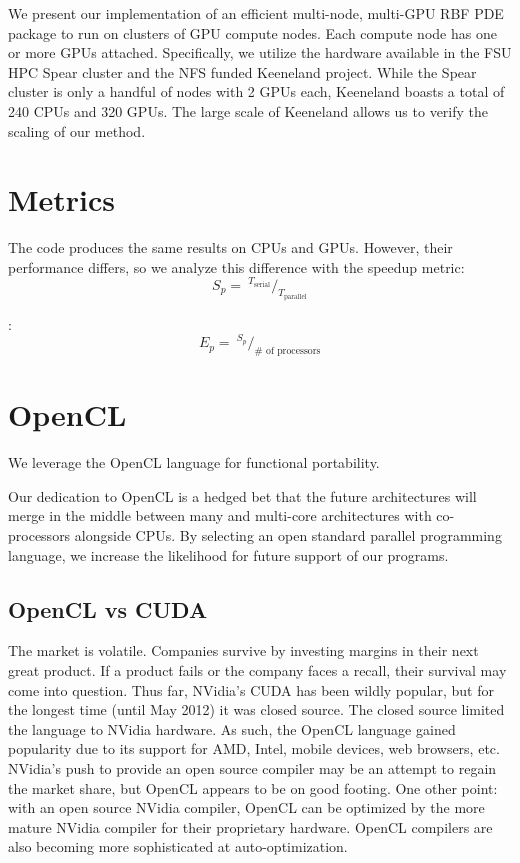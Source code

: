 
We present our implementation of an efficient multi-node, multi-GPU RBF PDE package to run on clusters of GPU compute nodes. Each compute node has one or more GPUs attached. Specifically, we utilize the hardware available in the FSU HPC Spear cluster and the NFS funded Keeneland project. While the Spear cluster is only a handful of nodes with 2 GPUs each, Keeneland boasts a total of 240 CPUs and 320 GPUs. The large scale of Keeneland allows us to verify the scaling of our method. 


\section{Metrics} 

The code produces the same results on CPUs and GPUs. However, their performance differs, so we analyze this difference with the speedup metric: 
$$ 
S_{p} =\ ^{T_{\text{serial}}} /_{T_{\text{parallel}}}
$$

: 
$$ 
E_{p} =\ ^{S_{p}} /_{\# \text{\ of processors}}
$$


\section{OpenCL}
We leverage the OpenCL language for functional portability. 

Our dedication to OpenCL is a hedged bet that the future architectures will merge in the middle between many and multi-core architectures with co-processors alongside CPUs. By selecting an open standard parallel programming language, we increase the likelihood for future support of our programs. 

\subsection{OpenCL vs CUDA}
The market is volatile. Companies survive by investing margins in their next great product. If a product fails or the company faces a recall, their survival may come into question. Thus far, NVidia's CUDA has been wildly popular, but for the longest time (until May 2012) it was closed source. The closed source limited the language to NVidia hardware. As such, the OpenCL language gained popularity due to its support for AMD, Intel, mobile devices, web browsers, etc. NVidia's push to provide an open source compiler may be an attempt to regain the market share, but OpenCL appears to be on good footing. One other point: with an open source NVidia compiler, OpenCL can be optimized by the more mature NVidia compiler for their proprietary hardware. OpenCL compilers are also becoming more sophisticated at auto-optimization. 

